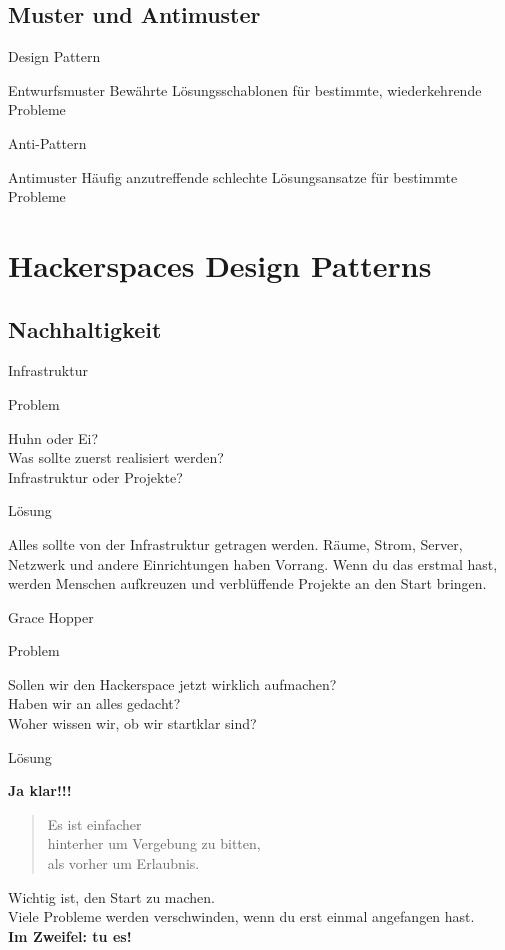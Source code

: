 \documentclass[aspectratio=1610]{beamer}
\newcommand{\concept}[2]{
  \begin{block}{#1}
    \pause
    #2
  \end{block}
}
\newcommand{\pattern}[2]{
  \begin{alertblock}{Problem}
    #1
  \end{alertblock}
  \pause
  \begin{exampleblock}{Lösung}
    #2
  \end{exampleblock}
}
\begin{document}
  \subsection{Muster und Antimuster}

  \begin{frame}{Design Pattern}
    \concept{Entwurfsmuster}{Bewährte Lösungsschablonen für bestimmte, wiederkehrende Probleme}
  \end{frame}

  \begin{frame}{Anti-Pattern}
    \concept{Antimuster}{Häufig anzutreffende schlechte Lösungsansatze für bestimmte Probleme}
  \end{frame}

  \section{Hackerspaces Design Patterns}

  \subsection{Nachhaltigkeit}

  \begin{frame}{Infrastruktur}
    \pattern{
      Huhn oder Ei?\\
      Was sollte zuerst realisiert werden?\\
      Infrastruktur oder Projekte?
    }{
      Alles sollte von der Infrastruktur getragen werden. Räume, Strom, Server,
      Netzwerk und andere Einrichtungen haben Vorrang. Wenn du das erstmal hast,
      werden Menschen aufkreuzen und verblüffende Projekte an den Start
      bringen.
    }
  \end{frame}

  \begin{frame}{Grace Hopper}
    \pattern{
      Sollen wir den Hackerspace jetzt wirklich aufmachen?\\
      Haben wir an alles gedacht?\\
      Woher wissen wir, ob wir startklar sind?
    }{
      \textbf{Ja klar!!!}
      \pause
      \begin{quote}
        Es ist einfacher\\
        hinterher um Vergebung zu bitten,\\
        als vorher um Erlaubnis.
      \end{quote}
      \pause
      Wichtig ist, den Start zu machen.\\
      Viele Probleme werden verschwinden, wenn du erst einmal angefangen hast.\\
      \textbf{Im Zweifel: tu es!}
    }
  \end{frame}
\end{document}
